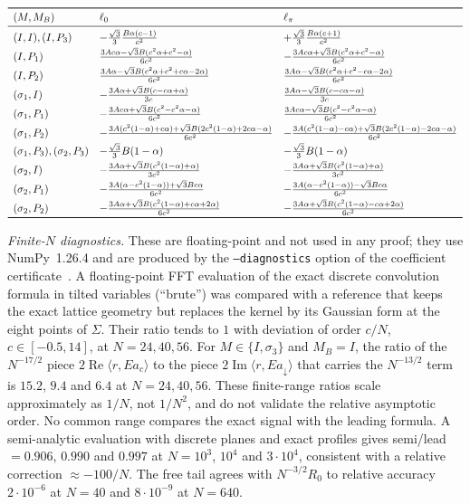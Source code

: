 \documentclass[11pt]{amsart}
\theoremstyle{definition}
\theoremstyle{remark}
\newcommand{\dn}{{\downarrow}}
\newcommand{\re}{\operatorname{Re}}
\newcommand{\im}{\operatorname{Im}}
\begin{document}
{\small
\[
\begin{array}{lll}
\toprule
(M,M_B) & \ell_0 & \ell_\pi\\
\midrule
(I,I),(I,P_3) & -\frac{\sqrt3}{3}\frac{B\alpha(c-1)}{c^2} & +\frac{\sqrt3}{3}\frac{B\alpha(c+1)}{c^2}\\[3pt]
(I,P_1) & \frac{3Ac\alpha-\sqrt3B(c^2\alpha+c^2-\alpha)}{6c^2} & -\frac{3Ac\alpha+\sqrt3B(c^2\alpha+c^2-\alpha)}{6c^2}\\[3pt]
(I,P_2) & \frac{3A\alpha-\sqrt3B(c^2\alpha+c^2+c\alpha-2\alpha)}{6c^2} & \frac{3A\alpha-\sqrt3B(c^2\alpha+c^2-c\alpha-2\alpha)}{6c^2}\\[3pt]
(\sigma_1,I) & -\frac{3A\alpha+\sqrt3B(c-c\alpha+\alpha)}{3c} & \frac{3A\alpha-\sqrt3B(c-c\alpha-\alpha)}{3c}\\[3pt]
(\sigma_1,P_1) & -\frac{3Ac\alpha+\sqrt3B(c^2-c^2\alpha-\alpha)}{6c^2} & \frac{3Ac\alpha-\sqrt3B(c^2-c^2\alpha-\alpha)}{6c^2}\\[3pt]
(\sigma_1,P_2) & -\frac{3A(c^2(1-\alpha)+c\alpha)+\sqrt3B(2c^2(1-\alpha)+2c\alpha-\alpha)}{6c^2} & -\frac{3A(c^2(1-\alpha)-c\alpha)+\sqrt3B(2c^2(1-\alpha)-2c\alpha-\alpha)}{6c^2}\\[3pt]
(\sigma_1,P_3),(\sigma_2,P_3) & -\frac{\sqrt3}{3}B(1-\alpha) & -\frac{\sqrt3}{3}B(1-\alpha)\\[3pt]
(\sigma_2,I) & -\frac{3A\alpha+\sqrt3B(c^2(1-\alpha)+\alpha)}{3c^2} & -\frac{3A\alpha+\sqrt3B(c^2(1-\alpha)+\alpha)}{3c^2}\\[3pt]
(\sigma_2,P_1) & -\frac{3A(\alpha-c^2(1-\alpha))+\sqrt3Bc\alpha}{6c^2} & -\frac{3A(\alpha-c^2(1-\alpha))-\sqrt3Bc\alpha}{6c^2}\\[3pt]
(\sigma_2,P_2) & -\frac{3A\alpha+\sqrt3B(c^2(1-\alpha)+c\alpha+2\alpha)}{6c^2} & -\frac{3A\alpha+\sqrt3B(c^2(1-\alpha)-c\alpha+2\alpha)}{6c^2}\\
\bottomrule
\end{array}
\]
}

\medskip\noindent\emph{Finite-$N$ diagnostics.}  These are floating-point
and not used in any proof; they use NumPy~1.26.4 and are produced by the
\texttt{--diagnostics} option of the coefficient certificate~\cite{Repo}.  A
floating-point FFT evaluation of the exact discrete convolution formula in
tilted variables (``brute'') was compared with a reference that keeps the
exact lattice geometry but replaces the kernel by its Gaussian form at the
eight points of $\Sigma$.  Their ratio tends to $1$ with deviation of order
$c/N$, $c\in[-0.5,14]$, at $N=24,40,56$.  For $M\in\{I,\sigma_3\}$ and
$M_B=I$, the ratio of the $N^{-17/2}$ piece $2\re\langle r,Ea_c\rangle$ to
the piece $2\im\langle r,Ea_\dn\rangle$ that carries the $N^{-13/2}$ term is
$15.2$, $9.4$ and $6.4$ at $N=24,40,56$. These finite-range ratios scale
approximately as $1/N$, not $1/N^2$, and do not validate the relative
asymptotic order. No common range compares the exact signal with the
leading formula. A semi-analytic evaluation with discrete
planes and exact profiles gives semi/lead $=0.906$, $0.990$ and $0.997$ at
$N=10^3$, $10^4$ and $3\cdot10^4$, consistent with a relative correction
$\approx-100/N$.  The free tail agrees with $N^{-3/2}R_0$ to relative
accuracy $2\cdot10^{-6}$ at $N=40$ and $8\cdot10^{-9}$ at $N=640$.
\end{document}
